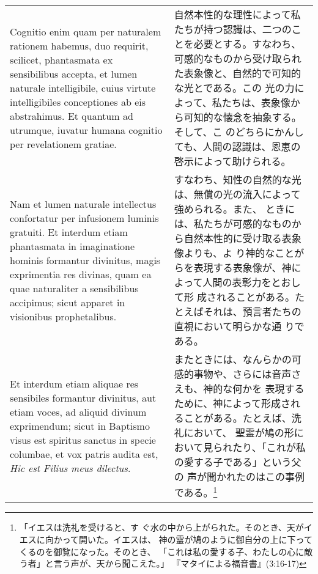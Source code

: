 \documentclass[10pt]{jsarticle} %
\begin{document}
\begin{longtable}{p{21em}p{21em}}
\\

Cognitio enim quam per naturalem rationem habemus, duo requirit,
scilicet, phantasmata ex sensibilibus accepta, et lumen naturale
intelligibile, cuius virtute intelligibiles conceptiones ab eis
abstrahimus. Et quantum ad utrumque, iuvatur humana cognitio per
revelationem gratiae.

&

自然本性的な理性によって私たちが持つ認識は、二つのことを必要とする。すなわち、
可感的なものから受け取られた表象像と、自然的で可知的な光とである。この
光の力によって、私たちは、表象像から可知的な懐念を抽象する。そして、こ
のどちらにかんしても、人間の認識は、恩恵の啓示によって助けられる。

\\

Nam et lumen naturale intellectus confortatur per infusionem luminis
gratuiti. Et interdum etiam phantasmata in imaginatione hominis
formantur divinitus, magis exprimentia res divinas, quam ea quae
naturaliter a sensibilibus accipimus; sicut apparet in visionibus
prophetalibus.

&

すなわち、知性の自然的な光は、無償の光の流入によって強められる。また、
ときには、私たちが可感的なものから自然本性的に受け取る表象像よりも、よ
り神的なことがらを表現する表象像が、神によって人間の表彰力をとおして形
成されることがある。たとえばそれは、預言者たちの直視において明らかな通
りである。

\\

Et interdum etiam aliquae res sensibiles formantur divinitus, aut
etiam voces, ad aliquid divinum exprimendum; sicut in Baptismo visus
est spiritus sanctus in specie columbae, et vox patris audita est,
{\it Hic est Filius meus dilectus}.

&

またときには、なんらかの可感的事物や、さらには音声さえも、神的な何かを
表現するために、神によって形成されることがある。たとえば、洗礼において、
聖霊が鳩の形において見られたり、「これが私の愛する子である」という父の
声が聞かれたのはこの事例である。\footnote{「イエスは洗礼を受けると、す
ぐ水の中から上がられた。そのとき、天がイエスに向かって開いた。イエスは、
神の霊が鳩のように御自分の上に下ってくるのを御覧になった。そのとき、
「これは私の愛する子、わたしの心に敵う者」と言う声が、天から聞こえた。」
『マタイによる福音書』(3:16-17)}

\\


\end{longtable}
\end{document}
